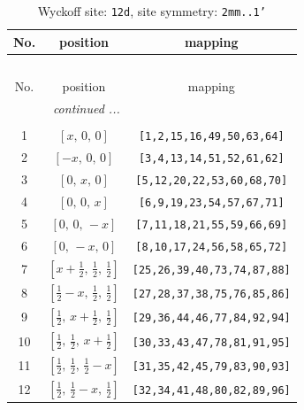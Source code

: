 \documentclass[fleqn,8pt]{jsarticle}
\begin{document}
\begin{longtable}{ccc}
\caption{Wyckoff site: {\tt 12d}, site symmetry: {\tt 2mm..1'}}
 \\
 \hline \hline
No. & position & mapping \\ \hline \endfirsthead

\multicolumn{2}{l}{\tablename\ \thetable{}} \\
 \hline \hline
No. & position & mapping \\ \hline \endhead

 \hline \hline
\multicolumn{2}{r}{\footnotesize\it continued ...} \\ \endfoot

 \hline \hline
\multicolumn{2}{r}{} \\ \endlastfoot

1 & $\left[ x,\, 0,\, 0 \right]$ & {\tt [1,2,15,16,49,50,63,64]} \\ \hline
2 & $\left[ - x,\, 0,\, 0 \right]$ & {\tt [3,4,13,14,51,52,61,62]} \\ \hline
3 & $\left[ 0,\, x,\, 0 \right]$ & {\tt [5,12,20,22,53,60,68,70]} \\ \hline
4 & $\left[ 0,\, 0,\, x \right]$ & {\tt [6,9,19,23,54,57,67,71]} \\ \hline
5 & $\left[ 0,\, 0,\, - x \right]$ & {\tt [7,11,18,21,55,59,66,69]} \\ \hline
6 & $\left[ 0,\, - x,\, 0 \right]$ & {\tt [8,10,17,24,56,58,65,72]} \\ \hline
7 & $\left[ x + \frac{1}{2},\, \frac{1}{2},\, \frac{1}{2} \right]$ & {\tt [25,26,39,40,73,74,87,88]} \\ \hline
8 & $\left[ \frac{1}{2} - x,\, \frac{1}{2},\, \frac{1}{2} \right]$ & {\tt [27,28,37,38,75,76,85,86]} \\ \hline
9 & $\left[ \frac{1}{2},\, x + \frac{1}{2},\, \frac{1}{2} \right]$ & {\tt [29,36,44,46,77,84,92,94]} \\ \hline
10 & $\left[ \frac{1}{2},\, \frac{1}{2},\, x + \frac{1}{2} \right]$ & {\tt [30,33,43,47,78,81,91,95]} \\ \hline
11 & $\left[ \frac{1}{2},\, \frac{1}{2},\, \frac{1}{2} - x \right]$ & {\tt [31,35,42,45,79,83,90,93]} \\ \hline
12 & $\left[ \frac{1}{2},\, \frac{1}{2} - x,\, \frac{1}{2} \right]$ & {\tt [32,34,41,48,80,82,89,96]} \\
\end{longtable}
\renewcommand{\arraystretch}{1.2}
\end{document}
